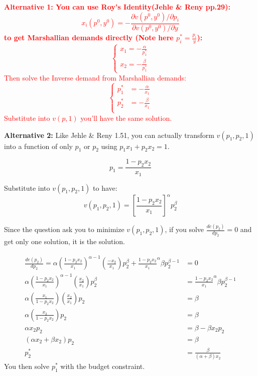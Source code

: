 \documentclass{article}
\begin{document}
\begin{mdframed}[backgroundcolor=blue!20,linecolor=white]
\textcolor{red}{
\textbf{Alternative 1:
\vspace{2mm}
You can use Roy's Identity(Jehle \& Reny pp.29): $$x_i(p^0,y^0) = - \frac{\partial v(p^0,y^0) / \partial p_i}{\partial v(p^0,y^0) / \partial y}$$
to get Marshallian demands directly (Note here $p^*_i = \frac{p_i}{y}$):
\begin{equation}
    \begin{cases}
    x_1 = - \frac{\alpha}{p^*_1} \\
    x_2 = - \frac{\beta}{p^*_1}
    \end{cases}
\nonumber
\end{equation}}
\vspace{2mm}
Then solve the Inverse demand from Marshallian demands:
\begin{equation}
    \begin{cases}
  p_1^* &= -\frac{\alpha}{x_1} \\
  p_2^* &= -\frac{\beta}{x_1} \\
    \end{cases}
\nonumber
\end{equation}
Substitute into $v(p,1)$ you'll have the same solution.
}


\vspace{2mm}

\textbf{Alternative 2:}
\vspace{2mm}
Like Jehle \& Reny 1.51, you can actually transform $v(p_1,p_2,1)$  into a function of only $p_1$ or $p_2$ using $p_1x_1 + p_2x_2 = 1$.

$$p_1 = \frac{1 - p_2x_2}{x_1}$$

Substitute into  $v(p_1,p_2,1)$ to have:
$$v(p_1,p_2,1) = [\frac{1 - p_2x_2}{x_1}]^\alpha p_2^\beta$$

Since the question ask you to minimize $v(p_1,p_2,1)$, if you solve $\frac{d e(p_2)}{d p_2} = 0$ and get only one solution, it is the solution.

\begin{align*}
\frac{d e(p_2)}{d p_2} =  \alpha(\frac{1-p_2x_2}{x_1})^{\alpha -1}(\frac{-x_2}{x_1})p_2^\beta +  \frac{1 - p_2x_2}{x_1}^\alpha \beta p_2^{\beta -1} &= 0 \\
 \alpha(\frac{1-p_2x_2}{x_1})^{\alpha -1}(\frac{x_2}{x_1})p_2^\beta &= \frac{1 - p_2x_2}{x_1}^\alpha \beta p_2^{\beta -1} \\
 \alpha(\frac{x_1}{1-p_2x_2})(\frac{x_2}{x_1})p_2 &= \beta  \\
\alpha(\frac{x_2}{1-p_2x_2}) p_2 &= \beta  \\
\alpha x_2 p_2 &= \beta-\beta x_2 p_2  \\
(\alpha x_2 + \beta x_2) p_2&= \beta  \\
 p^*_2&= \frac{\beta}{(\alpha + \beta)x_2} 
\end{align*}
You then solve $p^*_1$ with the budget constraint.
\end{mdframed}
\end{document}
